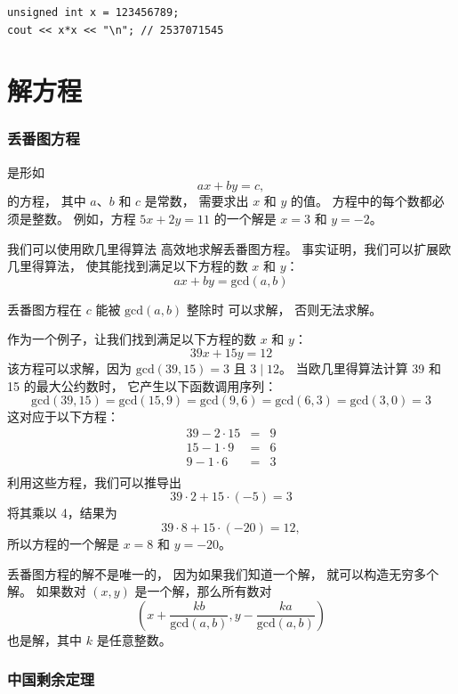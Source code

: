 \begin{lstlisting}
unsigned int x = 123456789;
cout << x*x << "\n"; // 2537071545
\end{lstlisting}

\section{解方程}

\subsubsection*{丢番图方程}


是形如
\[ ax + by = c, \]
的方程，
其中 $a$、$b$ 和 $c$ 是常数，
需要求出 $x$ 和 $y$ 的值。
方程中的每个数都必须是整数。
例如，方程
$5x+2y=11$ 的一个解是 $x=3$ 和 $y=-2$。


我们可以使用欧几里得算法
高效地求解丢番图方程。
事实证明，我们可以扩展欧几里得算法，
使其能找到满足以下方程的数 $x$ 和 $y$：
\[
ax + by = \textrm{gcd}(a,b)
\]

丢番图方程在 $c$ 能被
$\textrm{gcd}(a,b)$ 整除时
可以求解，
否则无法求解。

作为一个例子，让我们找到满足以下方程的数 $x$ 和 $y$：
\[
39x + 15y = 12
\]
该方程可以求解，因为
$\textrm{gcd}(39,15)=3$ 且 $3 \mid 12$。
当欧几里得算法计算
39 和 15 的最大公约数时，
它产生以下函数调用序列：
\[
\textrm{gcd}(39,15) = \textrm{gcd}(15,9)
= \textrm{gcd}(9,6) = \textrm{gcd}(6,3)
= \textrm{gcd}(3,0) = 3 \]
这对应于以下方程：
\[
\begin{array}{lcl}
39 - 2 \cdot 15 & = & 9 \\
15 - 1 \cdot 9 & = & 6 \\
9 - 1 \cdot 6 & = & 3 \\
\end{array}
\]
利用这些方程，我们可以推导出
\[
39 \cdot 2 + 15 \cdot (-5) = 3
\]
将其乘以 4，结果为
\[
39 \cdot 8 + 15 \cdot (-20) = 12,
\]
所以方程的一个解是
$x=8$ 和 $y=-20$。

丢番图方程的解不是唯一的，
因为如果我们知道一个解，
就可以构造无穷多个解。
如果数对 $(x,y)$ 是一个解，那么所有数对
\[(x+\frac{kb}{\textrm{gcd}(a,b)},y-\frac{ka}{\textrm{gcd}(a,b)})\]
也是解，其中 $k$ 是任意整数。

\subsubsection{中国剩余定理}


